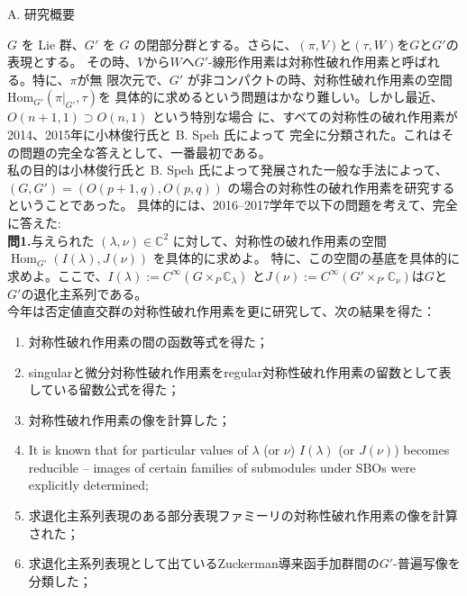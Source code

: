 \documentclass[a4j,twocolumn]{jarticle}
\begin{document}
\vspace{0.2cm}
\noindent
A. 研究概要

\vspace{0.1cm}

$G$ を Lie 群、$G'$ を $G$ の閉部分群とする。さらに、$(\pi,V)$と$(\tau,W)$を$G$と$G'$の表現とする。
その時、$V$から$W$へ$G'$-線形作用素は対称性破れ作用素と呼ばれる。特に、$\pi$が無
限次元で、$G'$ が非コンパクトの時、対称性破れ作用素の空間$\mbox{Hom}_{G'}(\pi\big|_{G'},\tau)$を
具体的に求めるという問題はかなり難しい。しかし最近、$O(n + 1, 1) \supset O(n, 1)$ という特別な場合
に、すべての対称性の破れ作用素が2014、2015年に小林俊行氏と B. Speh 氏によって
完全に分類された。これはその問題の完全な答えとして、一番最初である。\\
私の目的は小林俊行氏と B. Speh 氏によって発展された一般な手法によって、$(G, G') = (O(p+1,q),O(p,q))$
の場合の対称性の破れ作用素を研究するということであった。
具体的には、2016--2017学年で以下の問題を考えて、完全に答えた:\\
{\noindent}\textbf{問\textbf{1}.}{与えられた $( \lambda, \nu) \in
\mathbb{C}^2$
に対して、対称性の破れ作用素の空間 $\operatorname{Hom}_{G'}(I(\lambda),J(\nu))$ を具体的に求めよ。
特に、この空間の基底を具体的に求めよ。ここで、$I(\lambda):=C^{\infty}\left(  G\times_P\mathbb{C}_\lambda\right)$
と$J(\nu):=C^{\infty}\left( G'\times_{P'}\mathbb{C}_{\nu} \right)$は$G$と
$G'$の退化主系列である。}\\
今年は否定値直交群の対称性破れ作用素を更に研究して、次の結果を得た：
\begin{enumerate}
	\item 対称性破れ作用素の間の函数等式を得た；
	\item singularと微分対称性破れ作用素をregular対称性破れ作用素の留数として表している留数公式を得た；
	\item 対称性破れ作用素の像を計算した；
	\item It is known that for particular values of $\lambda$ (or $\nu$) $I(\lambda)$ (or $J(\nu)$) becomes reducible -- images of certain families of submodules under SBOs were explicitly determined;
	\item 求退化主系列表現のある部分表現ファミーリの対称性破れ作用素の像を計算された；
	\item 求退化主系列表現として出ているZuckerman導来函手加群間の$G'$-普遍写像を分類した；
\end{enumerate}
\end{document}

